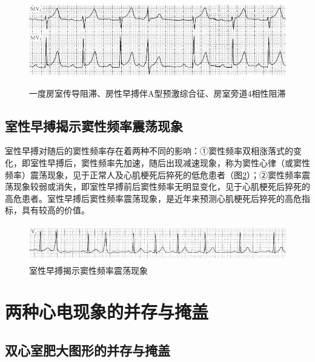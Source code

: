 \begin{figure}[!htbp]
 \centering
 \includegraphics[width=5.58333in,height=1.54167in]{./images/Image00582.jpg}
 \captionsetup{justification=centering}
 \caption{一度房室传导阻滞、房性早搏伴A型预激综合征、房室旁道4相性阻滞}
 \label{fig36-10}
  \end{figure} 

\protect\hypertarget{text00043.htmlux5cux23subid474}{}{}

\subsection{室性早搏揭示窦性频率震荡现象}

室性早搏对随后的窦性频率存在着两种不同的影响：①窦性频率双相涨落式的变化，即室性早搏后，窦性频率先加速，随后出现减速现象，称为窦性心律（或窦性频率）震荡现象，见于正常人及心肌梗死后猝死的低危患者（图\ref{fig36-11}）；②窦性频率震荡现象较弱或消失，即室性早搏前后窦性频率无明显变化，见于心肌梗死后猝死的高危患者。室性早搏后窦性频率震荡现象，是近年来预测心肌梗死后猝死的高危指标，具有较高的价值。

\begin{figure}[!htbp]
 \centering
 \includegraphics[width=5.58333in,height=0.63542in]{./images/Image00583.jpg}
 \captionsetup{justification=centering}
 \caption{室性早搏揭示窦性频率震荡现象}
 \label{fig36-11}
  \end{figure} 

\protect\hypertarget{text00043.htmlux5cux23subid475}{}{}

\section{两种心电现象的并存与掩盖}

\protect\hypertarget{text00043.htmlux5cux23subid476}{}{}

\subsection{双心室肥大图形的并存与掩盖}


